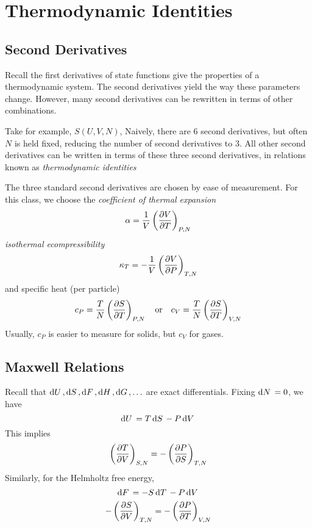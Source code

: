 \chapter{Thermodynamic Identities}
\section{Second Derivatives}
Recall the first derivatives of state functions give the properties of a thermodynamic system. The second derivatives yield the way these parameters change. However, many second derivatives can be rewritten in terms of other combinations.

Take for example, \(S(U,V,N)\), Naively, there are 6 second derivatives, but often \(N\) is held fixed, reducing the number of second derivatives to \(3\). All other second derivatives can be written in terms of these three second derivatives, in relations known as \emph{thermodynamic identities}

The three standard second derivatives are chosen by ease of measurement. For this class, we choose the \emph{coefficient of thermal expansion}
\begin{equation}
	\alpha = \frac{1}{V}\left(\frac{\partial V}{\partial T}\right)_{P,N}
\end{equation}
\emph{isothermal ecompressibility}
\begin{equation}
	\kappa_T = -\frac{1}{V}\left(\frac{\partial V}{\partial P}\right)_{T,N}
\end{equation}
and specific heat (per particle)
\begin{equation}
	c_P=\frac{T}{N}\left(\frac{\partial S}{\partial T}\right)_{P,N} \quad\text{or}\quad c_V=\frac{T}{N}\left(\frac{\partial S}{\partial T}\right)_{V,N}
\end{equation}
Usually, \(c_P\) is easier to measure for solids, but \(c_V\) for gases.

\section{Maxwell Relations}
Recall that \(\d{U},\d{S},\d{F},\d{H},\d{G},\ldots\) are exact differentials. Fixing \(\d{N}=0\), we have
\[\d{U}=T\d{S}-P\d{V}\]
This implies
\begin{equation}
	\left(\frac{\partial T}{\partial V}\right)_{S,N}=-\left(\frac{\partial P}{\partial S}\right)_{T,N}
\end{equation}
Similarly, for the Helmholtz free energy,
\[\d{F}=-S\d{T}-P\d{V}\]
\begin{equation}
	-\left(\frac{\partial S}{\partial V}\right)_{T,N}=-\left(\frac{\partial P}{\partial T}\right)_{V,N}
\end{equation}

